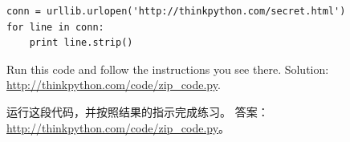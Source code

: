 \documentclass[10pt]{book}
\begin{document}
\begin{CJK}{UTF8}{gbsn}
\begin{exercise}
\begin{verbatim}
conn = urllib.urlopen('http://thinkpython.com/secret.html')
for line in conn:
    print line.strip()
\end{verbatim}

Run this code and follow the instructions you see there.
Solution: \url{http://thinkpython.com/code/zip_code.py}.

运行这段代码，并按照结果的指示完成练习。
答案：\url{http://thinkpython.com/code/zip_code.py}。

\end{exercise}





%







\end{CJK}
\end{document}
